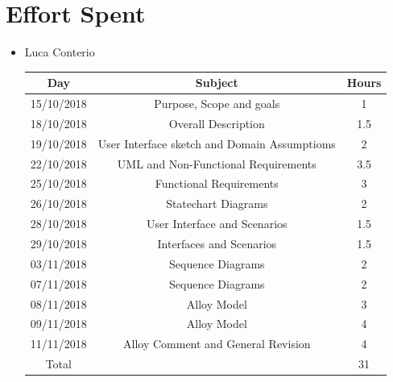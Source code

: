 \documentclass[12pt,a4paper]{article}
\begin{document}
	\section{Effort Spent}
	\begin{itemize}
		\item Luca Conterio
		\begin{center}
			\begin{tabular}{| c | c | c |}
				\hline
				Day & Subject & Hours \\ \hline
				15/10/2018 & Purpose, Scope and goals & 1 \\
				18/10/2018 & Overall Description & 1.5 \\
				19/10/2018  & User Interface sketch and Domain Assumptioms & 2 \\
				22/10/2018  & UML and Non-Functional Requirements & 3.5 \\
				25/10/2018 & Functional Requirements & 3 \\
				26/10/2018 & Statechart Diagrams & 2 \\
				28/10/2018 & User Interface and Scenarios & 1.5 \\
				29/10/2018 & Interfaces and Scenarios & 1.5 \\
				03/11/2018 & Sequence Diagrams & 2 \\
				07/11/2018 & Sequence Diagrams & 2 \\
				08/11/2018 & Alloy Model & 3 \\
				09/11/2018 & Alloy Model & 4 \\
				11/11/2018 & Alloy Comment and General Revision & 4 \\
				\hline
				Total & & 31 \\
				\hline
			\end{tabular}
		\end{center}


\end{itemize}
\end{document}

